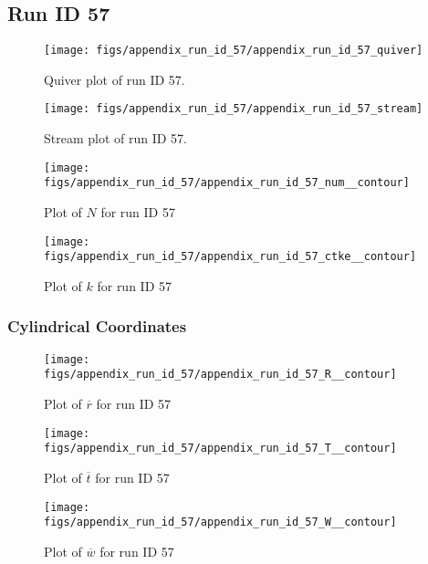 \subsection{Run ID 57}
\begin{figure}[H]
\centering
\texttt{[image: figs/appendix\_run\_id\_57/appendix\_run\_id\_57\_quiver]}
\caption{Quiver plot of run ID 57.}
\label{fig:appendix_run_id_57_quiver}
\end{figure}


\begin{figure}[H]
\centering
\texttt{[image: figs/appendix\_run\_id\_57/appendix\_run\_id\_57\_stream]}
\caption{Stream plot of run ID 57.}
\label{fig:appendix_run_id_57_stream}
\end{figure}


\begin{figure}[H]
\centering
\texttt{[image: figs/appendix\_run\_id\_57/appendix\_run\_id\_57\_num\_\_contour]}
\caption{Plot of $N$ for run ID 57}
\label{fig:appendix_run_id_57_num__contour}
\end{figure}


\begin{figure}[H]
\centering
\texttt{[image: figs/appendix\_run\_id\_57/appendix\_run\_id\_57\_ctke\_\_contour]}
\caption{Plot of $k$ for run ID 57}
\label{fig:appendix_run_id_57_ctke__contour}
\end{figure}


\subsubsection{Cylindrical Coordinates}
\begin{figure}[H]
\centering
\texttt{[image: figs/appendix\_run\_id\_57/appendix\_run\_id\_57\_R\_\_contour]}
\caption{Plot of $\overline{r}$ for run ID 57}
\label{fig:appendix_run_id_57_R__contour}
\end{figure}


\begin{figure}[H]
\centering
\texttt{[image: figs/appendix\_run\_id\_57/appendix\_run\_id\_57\_T\_\_contour]}
\caption{Plot of $\overline{t}$ for run ID 57}
\label{fig:appendix_run_id_57_T__contour}
\end{figure}


\begin{figure}[H]
\centering
\texttt{[image: figs/appendix\_run\_id\_57/appendix\_run\_id\_57\_W\_\_contour]}
\caption{Plot of $\overline{w}$ for run ID 57}
\label{fig:appendix_run_id_57_W__contour}
\end{figure}


